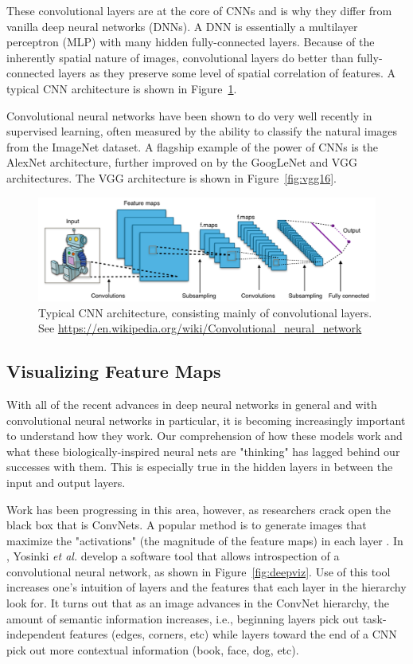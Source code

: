 \documentclass[hidelinks]{article}
\begin{document}
These convolutional layers are at the core of CNNs and is why they differ from vanilla deep neural networks (DNNs). A DNN is essentially a multilayer perceptron (MLP) with many hidden fully-connected layers. Because of the inherently spatial nature of images, convolutional layers do better than fully-connected layers as they preserve some level of spatial correlation of features. A typical CNN architecture is shown in Figure~\ref{fig:typical_cnn}.

Convolutional neural networks have been shown to do very well recently in supervised learning, often measured by the ability to classify the natural images from the ImageNet dataset. A flagship example of the power of CNNs is the AlexNet architecture\cite{Krizhevsky2012}, further improved on by the GoogLeNet \cite{Szegedy2014} and VGG \cite{Simonyan2015} architectures. The VGG architecture is shown in Figure~\ref{fig:vgg16}.

\begin{figure}[h]
  \centering
  \includegraphics[scale=0.35]{typical_cnn}
  \caption{Typical CNN architecture, consisting mainly of convolutional layers. See \url{https://en.wikipedia.org/wiki/Convolutional_neural_network}}
  \label{fig:typical_cnn}
\end{figure}

\subsection{Visualizing Feature Maps}
With all of the recent advances in deep neural networks in general and with convolutional neural networks in particular, it is becoming increasingly important to understand how they work. Our comprehension of how these models work and what these biologically-inspired neural nets are "thinking" has lagged behind our successes with them. This is especially true in the hidden layers in between the input and output layers.

Work has been progressing in this area, however, as researchers crack open the black box that is ConvNets. A popular method is to generate images that maximize the "activations" (the magnitude of the feature maps) in each layer \cite{Zeiler2014, Yosinski2015, Simonyan2014}. In \cite{Yosinski2015}, Yosinki \textit{et al.} develop a software tool that allows introspection of a convolutional neural network, as shown in Figure~\ref{fig:deepviz}. Use of this tool increases one's intuition of layers and the features that each layer in the hierarchy look for. It turns out that as an image advances in the ConvNet hierarchy, the amount of semantic information increases, i.e., beginning layers pick out task-independent features (edges, corners, etc) while layers toward the end of a CNN pick out more contextual information (book, face, dog, etc).
\end{document}
